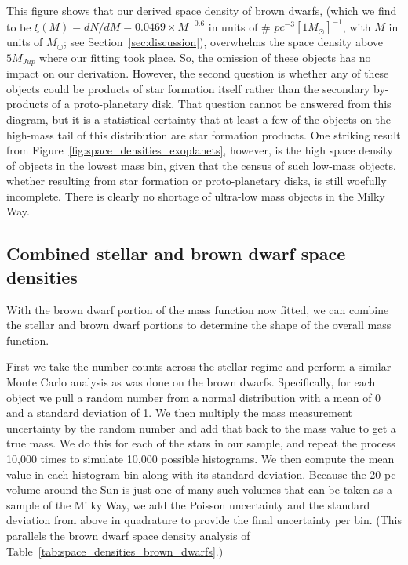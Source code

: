\documentclass[twocolumn,tighten,twocolappendix]{aastex631}
\begin{document}
This figure shows that our derived space density of brown dwarfs, (which we find to be $\xi(M) = dN/dM = 0.0469 \times M^{-0.6}$ in units of \# $pc^{-3} [1M_\odot]^{-1}$, with $M$ in units of $M_\odot$; see Section~\ref{sec:discussion}), overwhelms the space density above $5M_{Jup}$ where our fitting took place. So, the omission of these objects has no impact on our derivation. However, the second question is whether any of these objects could be products of star formation itself rather than the secondary by-products of a proto-planetary disk. That question cannot be answered from this diagram, but it is a statistical certainty that at least a few of the objects on the high-mass tail of this distribution are star formation products. One striking result from Figure~\ref{fig:space_densities_exoplanets}, however, is the high space density of objects in the lowest mass bin, given that the census of such low-mass objects, whether resulting from star formation or proto-planetary disks, is still woefully incomplete. There is clearly no shortage of ultra-low mass objects in the Milky Way.

\subsection{Combined stellar and brown dwarf space densities\label{sec:combining_stellar_and_BD_densities}}

With the brown dwarf portion of the mass function now fitted, we can combine the stellar and brown dwarf portions to determine the shape of the overall mass function.

First we take the number counts across the stellar regime and perform a similar Monte Carlo analysis as was done on the brown dwarfs. Specifically, for each object we pull a random number from a normal distribution with a mean of 0 and a standard deviation of 1. We then multiply the mass measurement uncertainty by the random number and add that back to the mass value to get a true mass. We do this for each of the stars in our sample, and repeat the process 10,000 times to simulate 10,000 possible histograms. We then compute the mean value in each histogram bin along with its standard deviation. Because the 20-pc volume around the Sun is just one of many such volumes that can be taken as a sample of the Milky Way, we add the Poisson uncertainty and the standard deviation from above in quadrature to provide the final uncertainty per bin. (This parallels the brown dwarf space density analysis of Table~\ref{tab:space_densities_brown_dwarfs}.)
\end{document}

